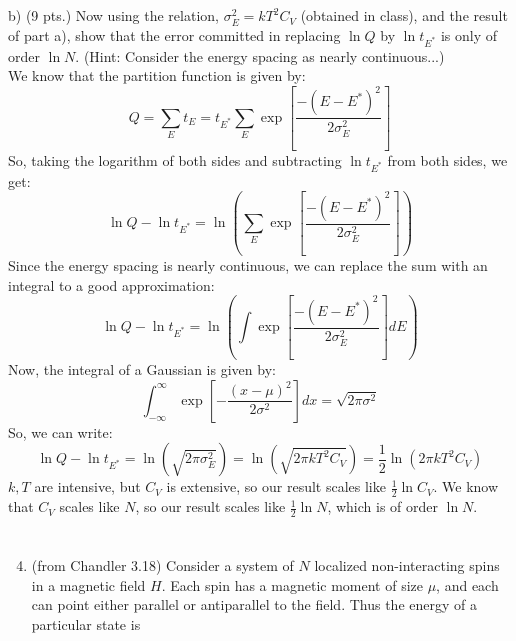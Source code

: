 \documentclass[10pt]{article}
\begin{document}
\subsection{}
b) (9 pts.) Now using the relation, $\sigma_{E}^{2}=k T^{2} C_{V}$ (obtained in class), and the result of part a), show that the error committed in replacing $\ln Q$ by $\ln t_{E^{*}}$ is only of order $\ln N$. (Hint: Consider the energy spacing as nearly continuous...)\\
We know that the partition function is given by:
\begin{equation}
  Q = \sum_{E} t_{E} = t_{E^{*}} \sum_{E} \exp \left[ \frac{-\left(E-E^{*}\right)^{2}}{2 \sigma_{E}^{2}} \right]
\end{equation}
So, taking the logarithm of both sides and subtracting $\ln t_{E^{*}}$ from both sides, we get:
\begin{equation}
  \ln Q - \ln t_{E^{*}} = \ln \left( \sum_{E} \exp \left[ \frac{-\left(E-E^{*}\right)^{2}}{2 \sigma_{E}^{2}} \right] \right)
\end{equation}
Since the energy spacing is nearly continuous, we can replace the sum with an integral to a good approximation:
\begin{equation}
  \ln Q - \ln t_{E^{*}} = \ln \left( \int \exp \left[ \frac{-\left(E-E^{*}\right)^{2}}{2 \sigma_{E}^{2}} \right] dE \right)
\end{equation}
Now, the integral of a Gaussian is given by:
\begin{equation}
  \int_{-\infty}^{\infty} \exp \left[ - \frac{\left( x - \mu \right)^{2}}{2 \sigma^{2}} \right] dx = \sqrt{2 \pi \sigma^{2}}
\end{equation}
So, we can write:
\begin{equation}
  \ln Q - \ln t_{E^{*}} = \ln \left( \sqrt{2 \pi \sigma_{E}^{2}} \right) = \ln \left( \sqrt{2 \pi k T^{2} C_{V}} \right) = \frac{1}{2} \ln \left( 2 \pi k T^{2} C_{V} \right)
\end{equation}
$k,T$ are intensive, but $C_{V}$ is extensive, so our result scales like $\frac{1}{2} \ln C_{V}$. We know that $C_{V}$ scales like $N$, so our result scales like $\frac{1}{2} \ln N$, which is of order $\ln N$.
\section{}
\begin{enumerate}
  \setcounter{enumi}{3}
  \item (from Chandler 3.18) Consider a system of $N$ localized non-interacting spins in a magnetic field $H$. Each spin has a magnetic moment of size $\mu$, and each can point either parallel or antiparallel to the field. Thus the energy of a particular state is
\end{enumerate}
\end{document}

